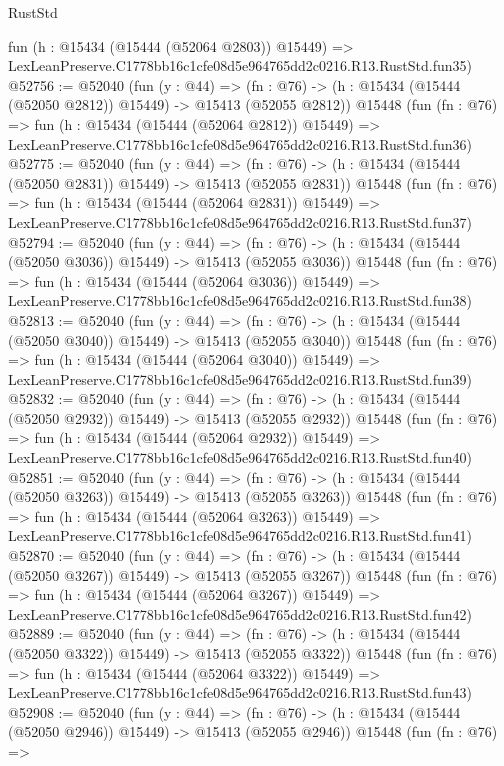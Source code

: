 \begin{lexlean}{RustStd}
\begin{coremodule}
    fun (h : @15434 (@15444 (@52064 @2803)) @15449) =>
    LexLeanPreserve.C1778bb16c1cfe08d5e964765dd2c0216.R13.RustStd.fun35)
@52756 := @52040
    (fun (y : @44) =>
    (fn : @76) -> (h : @15434 (@15444 (@52050 @2812)) @15449) -> @15413 (@52055 @2812))
    @15448
    (fun (fn : @76) =>
    fun (h : @15434 (@15444 (@52064 @2812)) @15449) =>
    LexLeanPreserve.C1778bb16c1cfe08d5e964765dd2c0216.R13.RustStd.fun36)
@52775 := @52040
    (fun (y : @44) =>
    (fn : @76) -> (h : @15434 (@15444 (@52050 @2831)) @15449) -> @15413 (@52055 @2831))
    @15448
    (fun (fn : @76) =>
    fun (h : @15434 (@15444 (@52064 @2831)) @15449) =>
    LexLeanPreserve.C1778bb16c1cfe08d5e964765dd2c0216.R13.RustStd.fun37)
@52794 := @52040
    (fun (y : @44) =>
    (fn : @76) -> (h : @15434 (@15444 (@52050 @3036)) @15449) -> @15413 (@52055 @3036))
    @15448
    (fun (fn : @76) =>
    fun (h : @15434 (@15444 (@52064 @3036)) @15449) =>
    LexLeanPreserve.C1778bb16c1cfe08d5e964765dd2c0216.R13.RustStd.fun38)
@52813 := @52040
    (fun (y : @44) =>
    (fn : @76) -> (h : @15434 (@15444 (@52050 @3040)) @15449) -> @15413 (@52055 @3040))
    @15448
    (fun (fn : @76) =>
    fun (h : @15434 (@15444 (@52064 @3040)) @15449) =>
    LexLeanPreserve.C1778bb16c1cfe08d5e964765dd2c0216.R13.RustStd.fun39)
@52832 := @52040
    (fun (y : @44) =>
    (fn : @76) -> (h : @15434 (@15444 (@52050 @2932)) @15449) -> @15413 (@52055 @2932))
    @15448
    (fun (fn : @76) =>
    fun (h : @15434 (@15444 (@52064 @2932)) @15449) =>
    LexLeanPreserve.C1778bb16c1cfe08d5e964765dd2c0216.R13.RustStd.fun40)
@52851 := @52040
    (fun (y : @44) =>
    (fn : @76) -> (h : @15434 (@15444 (@52050 @3263)) @15449) -> @15413 (@52055 @3263))
    @15448
    (fun (fn : @76) =>
    fun (h : @15434 (@15444 (@52064 @3263)) @15449) =>
    LexLeanPreserve.C1778bb16c1cfe08d5e964765dd2c0216.R13.RustStd.fun41)
@52870 := @52040
    (fun (y : @44) =>
    (fn : @76) -> (h : @15434 (@15444 (@52050 @3267)) @15449) -> @15413 (@52055 @3267))
    @15448
    (fun (fn : @76) =>
    fun (h : @15434 (@15444 (@52064 @3267)) @15449) =>
    LexLeanPreserve.C1778bb16c1cfe08d5e964765dd2c0216.R13.RustStd.fun42)
@52889 := @52040
    (fun (y : @44) =>
    (fn : @76) -> (h : @15434 (@15444 (@52050 @3322)) @15449) -> @15413 (@52055 @3322))
    @15448
    (fun (fn : @76) =>
    fun (h : @15434 (@15444 (@52064 @3322)) @15449) =>
    LexLeanPreserve.C1778bb16c1cfe08d5e964765dd2c0216.R13.RustStd.fun43)
@52908 := @52040
    (fun (y : @44) =>
    (fn : @76) -> (h : @15434 (@15444 (@52050 @2946)) @15449) -> @15413 (@52055 @2946))
    @15448
    (fun (fn : @76) =>

\end{coremodule}
\end{lexlean}
